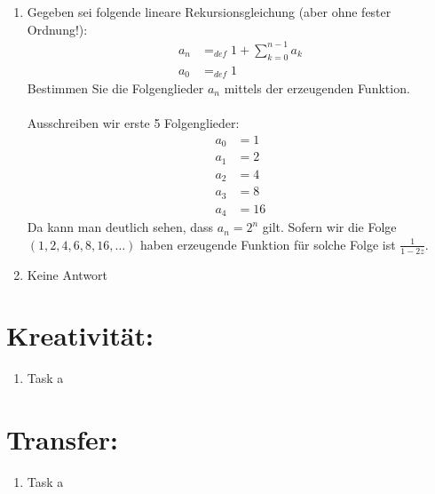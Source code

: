 \begin{enumerate}[label=(\alph*)]
        \item Gegeben sei folgende lineare Rekursionsgleichung (aber ohne fester Ordnung!):
        \begin{align*}
            a_n &=_{def} 1 + \sum_{k=0}^{n-1} a_k \\
            a_0 &=_{def} 1
        \end{align*}
        Bestimmen Sie die Folgenglieder $a_n$ mittels der erzeugenden Funktion.\\\\
        Ausschreiben wir erste 5 Folgenglieder:
        \begin{align*}
            a_0 &= 1\\
            a_1 &= 2\\
            a_2 &= 4\\
            a_3 &= 8\\
            a_4 &= 16
        \end{align*}
        Da kann man deutlich sehen, dass $a_n = 2^n$ gilt. Sofern wir die Folge $(1,2,4,6,8,16,\ldots)$
        haben erzeugende Funktion für solche Folge ist $\displaystyle\frac{1}{1-2z}$.

        \item Keine Antwort
    \end{enumerate}
    \section*{Kreativität:}
    \begin{enumerate}[label=(\alph*)]
        \item Task a
    \end{enumerate}
    \section*{Transfer:}
    \begin{enumerate}[label=(\alph*)]
        \item Task a
    \end{enumerate}







